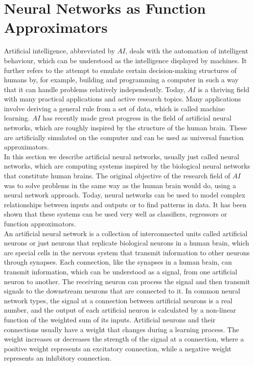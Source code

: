\section{Neural Networks as Function Approximators}
\label{ch1:sec3}

Artificial intelligence, abbreviated by $AI$, deals with the automation of intelligent behaviour, which can be understood as the intelligence displayed by machines. It further refers to the attempt to emulate certain decision-making structures of humans by, for example, building and programming a computer in such a way that it can handle problems relatively independently. Today, $AI$ is a thriving field with many practical applications and active research topics. Many applications involve deriving a general rule from a set of data, which is called machine learning. $AI$ has recently made great progress in the field of artificial neural networks, which are roughly inspired by the structure of the human brain. These are artificially simulated on the computer and can be used as universal function approximators. \\
In this section we describe artificial neural networks, usually just called neural networks, which are computing systems inspired by the biological neural networks that constitute human brains. The original objective of the research field of $AI$ was to solve problems in the same way as the human brain would do, using a neural network approach. Today, neural networks can be used to model complex relationships between inputs and outputs or to find patterns in data. It has been shown that these systems can be used very well as classifiers, regressors or function approximators. \\
An artificial neural network is a collection of interconnected units called artificial neurons or just neurons that replicate biological neurons in a human brain, which are special cells in the nervous system that transmit information to other neurons through synapses. Each connection, like the synapses in a human brain, can transmit information, which can be understood as a signal, from one artificial neuron to another. The receiving neuron can process the signal and then transmit signals to the downstream neurons that are connected to it. In common neural network types, the signal at a connection between artificial neurons is a real number, and the output of each artificial neuron is calculated by a non-linear function of the weighted sum of its inputs. Artificial neurons and their connections usually have a weight that changes during a learning process. The weight increases or decreases the strength of the signal at a connection, where a positive weight represents an excitatory connection, while a negative weight represents an inhibitory connection. \\
